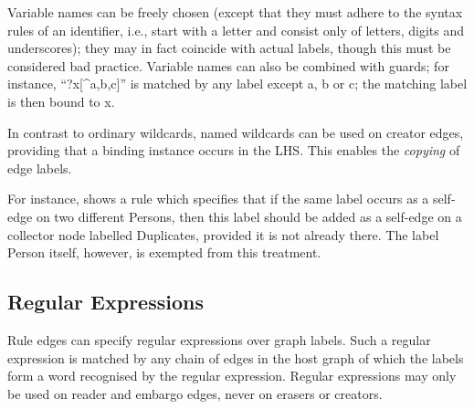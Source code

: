 Variable names can be freely chosen (except that they must adhere to the syntax
rules of an identifier, i.e., start with a letter and consist only of letters,
digits and underscores); they may in fact coincide with actual labels, though
this must be considered bad practice. Variable names can also be combined with
guards; for instance, ``\textsf{?x[\^{}a,b,c]}'' is matched by any label except
\textsf{a}, \textsf{b} or \textsf{c}; the matching label is then bound to
\textsf{x}.

In contrast to ordinary wildcards, named wildcards can be used on creator
edges, providing that a binding instance occurs in the LHS. This enables the
\emph{copying} of edge labels.

For instance,  shows a rule which specifies that if the same
label occurs as a self-edge on two different \textsf{Person}s, then this label should
be added as a self-edge on a collector node labelled \textsf{Duplicates},
provided it is not already there. The
label \textsf{Person} itself, however, is exempted from this treatment.


\subsection{Regular Expressions}

Rule edges can specify regular expressions over graph labels. Such a regular
expression is matched by any chain of edges in the host graph of which the
labels form a word recognised by the regular expression. Regular expressions
may only be used on reader and embargo edges, never on erasers or creators.

